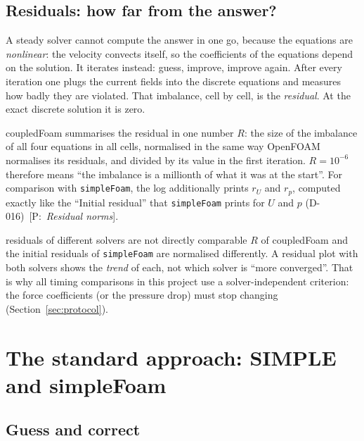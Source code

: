 \documentclass[11pt,a4paper]{article}
\newcommand{\code}[1]{\texttt{#1}}
\newcommand{\pro}[1]{\ {\small[P:~\textit{#1}]}}
\begin{document}
\subsection{Residuals: how far from the answer?}\label{sec:residual}

A steady solver cannot compute the answer in one go, because the equations
are \emph{nonlinear}: the velocity convects itself, so the coefficients of
the equations depend on the solution. It iterates instead: guess, improve,
improve again. After every iteration one plugs the current fields into the
discrete equations and measures how badly they are violated. That
imbalance, cell by cell, is the \emph{residual}. At the exact discrete
solution it is zero.

coupledFoam summarises the residual in one number $R$: the size of the
imbalance of all four equations in all cells, normalised in the same way
OpenFOAM normalises its residuals, and divided by its value in the first
iteration. $R=10^{-6}$ therefore means ``the imbalance is a millionth of
what it was at the start''. For comparison with \code{simpleFoam}, the log
additionally prints $r_U$ and $r_p$, computed exactly like the ``Initial
residual'' that \code{simpleFoam} prints for $U$ and $p$
(D-016)\pro{Residual norms}.

\begin{pitfall}{residuals of different solvers are not directly comparable}
  $R$ of coupledFoam and the initial residuals of \code{simpleFoam} are
  normalised differently. A residual plot with both solvers shows the
  \emph{trend} of each, not which solver is ``more converged''. That is why
  all timing comparisons in this project use a solver-independent
  criterion: the force coefficients (or the pressure drop) must stop
  changing (Section~\ref{sec:protocol}).
\end{pitfall}

\section{The standard approach: SIMPLE and simpleFoam}\label{sec:simple}

\subsection{Guess and correct}
\end{document}
